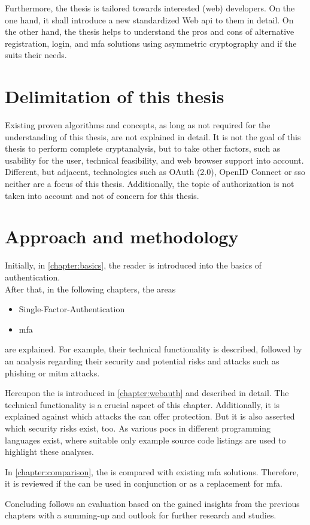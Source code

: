 Furthermore, the thesis is tailored towards interested (web) developers. On the one hand, it shall introduce a new standardized Web \gls{api} to them in detail. On the other hand, the thesis helps to understand the pros and cons of alternative registration, login, and \gls{mfa} solutions using asymmetric cryptography and if the \wa{} suits their needs.

\section{Delimitation of this thesis}

Existing proven algorithms and concepts, as long as not required for the understanding of this thesis, are not explained in detail. It is not the goal of this thesis to perform complete cryptanalysis, but to take other factors, such as usability for the user, technical feasibility, and web browser support into account. Different, but adjacent, technologies such as OAuth (2.0), OpenID Connect or \gls{sso} neither are a focus of this thesis. Additionally, the topic of authorization is not taken into account and not of concern for this thesis. 

\section{Approach and methodology}

Initially, in \autoref{chapter:basics}, the reader is introduced into the basics of authentication.\\
After that, in the following chapters, the areas

\begin{itemize}
	\item Single-Factor-Authentication
	\item \gls{mfa}
\end{itemize}

are explained. For example, their technical functionality is described, followed by an analysis regarding their security and potential risks and attacks such as phishing or \gls{mitm} attacks.

Hereupon the \wa{} is introduced in \autoref{chapter:webauth} and described in detail. The technical functionality is a crucial aspect of this chapter. Additionally, it is explained against which attacks the \wa{} can offer protection. But it is also asserted which security risks exist, too. As various \glspl{poc} in different programming languages exist, where suitable only example source code listings are used to highlight these analyses.

In \autoref{chapter:comparison}, the \wa{} is compared with existing \gls{mfa} solutions. Therefore, it is reviewed if the \wa{} can be used in conjunction or as a replacement for \gls{mfa}.

Concluding follows an evaluation based on the gained insights from the previous chapters with a summing-up and outlook for further research and studies.
